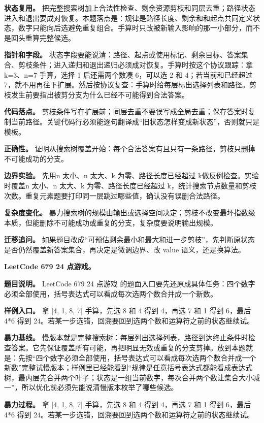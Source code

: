\textbf{状态复用。} 把完整搜索树加上合法性检查、剩余资源剪枝和同层去重；路径状态进入和退出要成对恢复。本题落点是：规律是路径长度、剩余和和起点共同定义状态，数字只能向后选避免重复组合。手算时只改被新输入影响的那一小部分，而不是回头重算完整候选。

\textbf{指针和字段。} 状态字段要能说清：路径、起点或使用标记、剩余目标、答案集合、剪枝条件；进入递归和退出递归必须成对恢复。手算时按这个协议跟踪：拿 k=3、n=7 手算，选择 1 后还需两个数凑 6，可以选 2 和 4；若当前和已经超过 7，就不用再往下扩展。然后按协议复查：手算时给每层标出选择列表和路径。剪枝发生前要指出被剪分支为什么已经不可能得到合法答案。

\textbf{代码落点。} 剪枝条件写在扩展前；同层去重不要误写成全局去重；保存答案时复制当前路径。关键代码行必须能逐句翻译成“旧状态怎样变成新状态”，否则就只是模板。

\textbf{正确性。} 证明从搜索树覆盖开始：每个合法答案有且只有一条路径，剪枝只删掉不可能成功的分支。

\textbf{边界实验。} 先用n 太小、n 太大、k 为零、路径长度已经超过 k做反例检查。实验时覆盖n 太小、n 太大、k 为零、路径长度已经超过 k，统计搜索节点数量和剪枝次数。重复元素题要打印同一层跳过哪些值，确认没有误删合法路径。

\textbf{复杂度变化。} 暴力搜索树的规模由输出或选择空间决定；剪枝不改变最坏指数级本质，但能删除不可能成功或重复的分支，复杂度要说明输出规模。

\textbf{迁移追问。} 如果题目改成“可预估剩余最小和最大和进一步剪枝”，先判断原状态是否仍然覆盖新答案集合，再决定是微调边界、改 value 语义，还是换算法。

\noindent\textbf{LeetCode 679 24 点游戏。}

\textbf{题目说明。} LeetCode 679 24 点游戏 的题面入口要先还原成具体任务：四个数字必须全部使用，括号表达式可以看成每次选两个数合并成一个新数。

\textbf{样例入口。} 拿 [4, 1, 8, 7] 手算，先选 8 和 4 得到 4，再选 7 和 1 得到 6，最后 4*6 得到 24。若某一步选错，回溯要回到选两个数和运算符之前的状态继续试。

\textbf{暴力基线。} 慢版本就是完整搜索树：每层列出选择列表，路径到达终止条件时检查答案。它先保证覆盖所有可能，再把明显无效或重复的分支剪掉。放到本题就是：先按“四个数字必须全部使用，括号表达式可以看成每次选两个数合并成一个新数”完整试慢版本；样例里已经能看到“规律是任意括号表达式都能看成表达式树，最内层先合并两个叶子；状态是一组当前数字，每次合并两个数让集合大小减一”，所以优化前必须先能说清慢版本枚举了哪些候选。

\textbf{暴力过程。} 拿 [4, 1, 8, 7] 手算，先选 8 和 4 得到 4，再选 7 和 1 得到 6，最后 4*6 得到 24。若某一步选错，回溯要回到选两个数和运算符之前的状态继续试。

